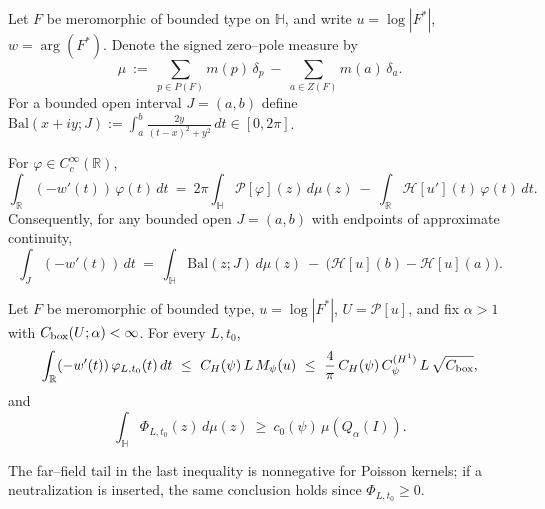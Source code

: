 Let $F$ be meromorphic of bounded type on $\mathbb{H}$, and write $u=\log|F^*|$, $w=\arg(F^*)$. Denote the signed zero–pole measure by
\[\mu\ :=\ \sum_{p\in P(F)} m(p)\,\delta_p\ -\ \sum_{a\in Z(F)} m(a)\,\delta_a.\]
For a bounded open interval $J=(a,b)$ define $\mathrm{Bal}(x+iy;J):=\int_a^b\tfrac{2y}{(t-x)^2+y^2}\,dt\in[0,2\pi]$.

\begin{proposition}\label{prop:phase-velocity}
For $\varphi\in C_c^\infty(\mathbb{R})$,
\[\int_{\mathbb{R}} (-w'(t))\,\varphi(t)\,dt\ =\ 2\pi\int_{\mathbb{H}} \mathcal{P}[\varphi](z)\,d\mu(z)\ -\ \int_{\mathbb{R}}\mathcal{H}[u'](t)\,\varphi(t)\,dt.\]
Consequently, for any bounded open $J=(a,b)$ with endpoints of approximate continuity,
\[\int_{J} (-w'(t))\,dt\ =\ \int_{\mathbb{H}}\mathrm{Bal}(z;J)\,d\mu(z)\ -\ \big(\mathcal{H}[u](b)-\mathcal{H}[u](a)\big).\]
\end{proposition}

\begin{theorem}\label{thm:certificate-distribution}
Let $F$ be meromorphic of bounded type, $u=\log|F^*|$, $U=\mathcal P[u]$, and fix $\alpha>1$ with $C_{\rm box}(U;\alpha)<\infty$. For every $L,t_0$,
\[\int_{\mathbb{R}} (-w'(t))\,\varphi_{L,t_0}(t)\,dt\ \le\ C_H(\psi)\,L\,M_\psi(u)\ \le\ \frac{4}{\pi}\,C_H(\psi)\,C_\psi^{(H^1)}\,L\,\sqrt{C_{\rm box}},\]
and
\[\int_{\mathbb{H}}\Phi_{L,t_0}(z)\,d\mu(z)\ \ge\ c_0(\psi)\,\mu\!\left(Q_\alpha(I)\right).\]
\end{theorem}

\begin{remark}
The far–field tail in the last inequality is nonnegative for Poisson kernels; if a neutralization is inserted, the same conclusion holds since $\Phi_{L,t_0}\ge 0$.
\end{remark}
